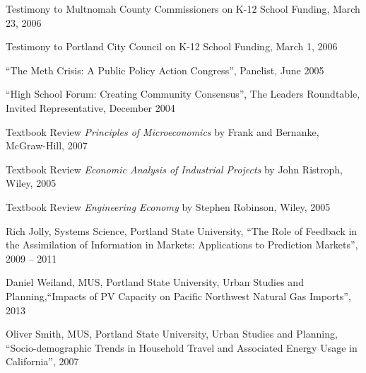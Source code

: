 \documentclass[Computer Science]{vita}
\begin{document}
\begin{vita}
\begin{Community Outreach}
  \item Testimony to Multnomah County Commissioners on K-12 School
    Funding, March 23, 2006

  \item Testimony to Portland City Council on K-12 School Funding,
    March 1, 2006

  \item ``The Meth Crisis: A Public Policy Action Congress'',
    Panelist, June 2005

  \item ``High School Forum: Creating Community Consensus'', The
    Leaders Roundtable, Invited Representative, December 2004
  \end{Community Outreach}

  \begin{Instructional Activities}

    \begin{Reviews}
    \item Textbook Review \emph{Principles of Microeconomics} by
      Frank and Bernanke, McGraw-Hill, 2007

    \item Textbook Review \emph{Economic Analysis of Industrial
        Projects} by John Ristroph, Wiley, 2005

    \item Textbook Review \emph{Engineering Economy} by Stephen
      Robinson, Wiley, 2005
    \end{Reviews}

    \begin{Ph.D. Thesis Committee}
    \item Rich Jolly, Systems Science, Portland State University,
      ``The Role of Feedback in the Assimilation of Information in
      Markets: Applications to Prediction Markets'', 2009 -- 2011


    \end{Ph.D. Thesis Committee}

    \begin{M.S. Thesis Adviser}
    \item Daniel Weiland, MUS, Portland State University,
      Urban Studies and Planning,``Impacts of PV Capacity on Pacific Northwest Natural Gas Imports'', 2013
    
    \item Oliver Smith, MUS, Portland State University,
      Urban Studies and Planning, ``Socio-demographic Trends in
      Household Travel and Associated Energy Usage in California'',
      2007


\end{M.S. Thesis Adviser}
\end{Instructional Activities}
\end{vita}
\end{document}
